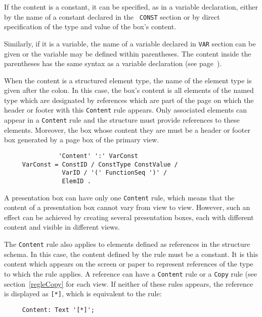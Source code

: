 If the content is a constant, it can be specified, as in a variable
declaration, either by the name of a constant declared in the {\tt
CONST} section or by direct specification of the type and value of the
box's content.

Similarly, if it is a variable, the name of a variable declared in
{\tt VAR} section can be given or the variable may be defined within
parentheses.  The content inside the parentheses has the same syntax
as a variable declaration (see page~\pageref{variables}).

When the content is a structured element type, the name of the element
type is given after the colon.  In this case,  the box's content is
all elements of the named type which are designated by references
which are part of the page on which the header or footer with this
{\tt Content} rule appears.  Only associated elements can appear in a
{\tt Content} rule and the structure must provide references to these
elements.  Moreover, the box whose content they are must be a header
or footer box generated by a page box of the primary view.

\begin{verbatim}
               'Content' ':' VarConst
     VarConst = ConstID / ConstType ConstValue /
                VarID / '(' FunctionSeq ')' /
                ElemID .
\end{verbatim}

A presentation box can have only one {\tt Content} rule, which means
that the content of a presentation box cannot vary from view to view.
However, such an effect can be achieved by creating several
presentation boxes, each with different content and visible in
different views.

The {\tt Content} rule also applies to elements defined as references
in the structure schema.  In this case, the content defined by the
rule  must be a constant.  It is this content which appears on the
screen or paper to represent references of the type to which the rule
applies.  A reference can have a {\tt Content} rule or a {\tt Copy}
rule (see section~\ref{regleCopy} for each view.  If neither of these
rules appears, the reference is displayed as {\tt [*]}, which is
equivalent to the rule:

\begin{verbatim}
     Content: Text '[*]';
\end{verbatim}

